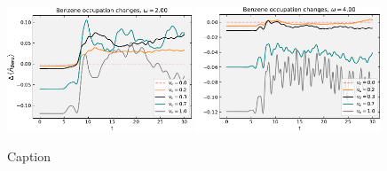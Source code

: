 \begin{figure}[!hbt]
    \centering
    \includegraphics[width=0.49\textwidth]{graph/occupation/occupation_w2_Benz_sum_vcsweep.pdf}
    \includegraphics[width=0.49\textwidth]{graph/occupation/occupation_w4_Benz_sum_vcsweep.pdf}
    \caption{Caption}
    \label{fig:occupation_qd_benzene_sum_vc_03}
\end{figure}